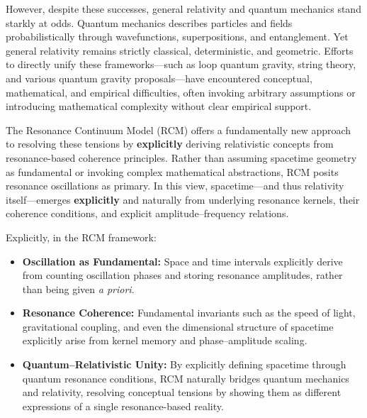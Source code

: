 However, despite these successes, general relativity and quantum mechanics stand starkly at odds. Quantum mechanics describes particles and fields probabilistically through wavefunctions, superpositions, and entanglement. Yet general relativity remains strictly classical, deterministic, and geometric. Efforts to directly unify these frameworks—such as loop quantum gravity, string theory, and various quantum gravity proposals—have encountered conceptual, mathematical, and empirical difficulties, often invoking arbitrary assumptions or introducing mathematical complexity without clear empirical support.

The Resonance Continuum Model (RCM) offers a fundamentally new approach to resolving these tensions by \textbf{explicitly} deriving relativistic concepts from resonance-based coherence principles. Rather than assuming spacetime geometry as fundamental or invoking complex mathematical abstractions, RCM posits resonance oscillations as primary. In this view, spacetime—and thus relativity itself—emerges \textbf{explicitly} and naturally from underlying resonance kernels, their coherence conditions, and explicit amplitude–frequency relations.

Explicitly, in the RCM framework:
\begin{itemize}
  \item \textbf{Oscillation as Fundamental:} Space and time intervals explicitly derive from counting oscillation phases and storing resonance amplitudes, rather than being given \emph{a priori}.
  \item \textbf{Resonance Coherence:} Fundamental invariants such as the speed of light, gravitational coupling, and even the dimensional structure of spacetime explicitly arise from kernel memory and phase–amplitude scaling.
  \item \textbf{Quantum–Relativistic Unity:} By explicitly defining spacetime through quantum resonance conditions, RCM naturally bridges quantum mechanics and relativity, resolving conceptual tensions by showing them as different expressions of a single resonance-based reality.
\end{itemize}

